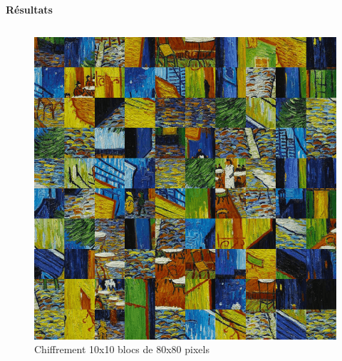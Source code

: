 \documentclass{beamer}
\begin{document}
\begin{frame}[t]
\begin{columns}[t]
\begin{column}{.5\linewidth}
\begin{block}{\centering \textbf{Résultats}}
\begin{columns}[t]
                        \begin{column}{.25\linewidth}

                        \end{column}
                    \end{columns}

                    \begin{columns}[t]
                        \begin{column}{.25\linewidth}
                            \begin{figure}[t]
                                \includegraphics[width=\linewidth]{rsc/van_gogh_10_12.png}\\
                                {\small Chiffrement 10x10 blocs de 80x80 pixels}
                            \end{figure}
                        \end{column}


\end{columns}
\end{block}
\end{column}
\end{columns}
\end{frame}
\end{document}

